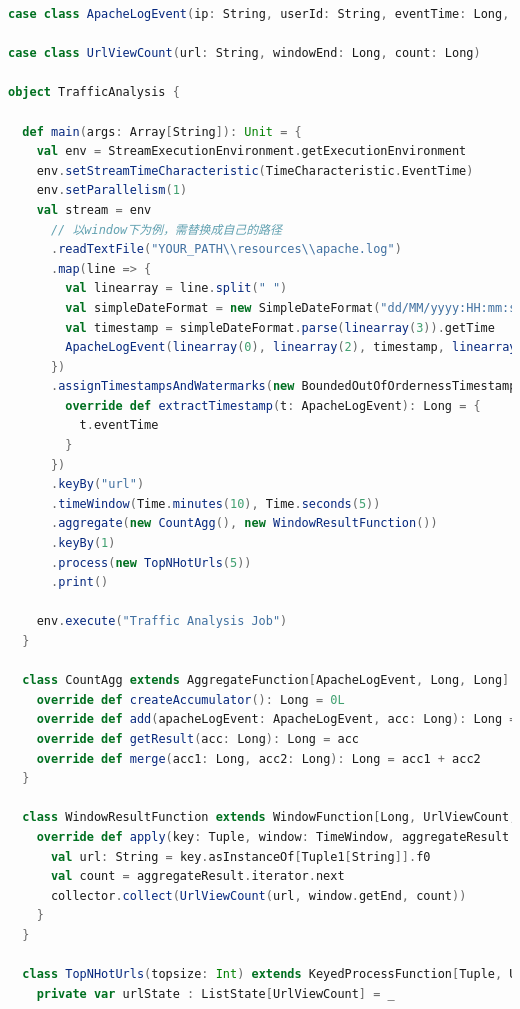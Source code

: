 \documentclass[oneside]{ctexbook}
\begin{document}
\begin{lstlisting}[language=scala, caption=NetworkTrafficAnalysis/src/main/scala/TrafficAnalysis.scala]
case class ApacheLogEvent(ip: String, userId: String, eventTime: Long, method: String, url: String)

case class UrlViewCount(url: String, windowEnd: Long, count: Long)

object TrafficAnalysis {

  def main(args: Array[String]): Unit = {
    val env = StreamExecutionEnvironment.getExecutionEnvironment
    env.setStreamTimeCharacteristic(TimeCharacteristic.EventTime)
    env.setParallelism(1)
    val stream = env
      // 以window下为例，需替换成自己的路径
      .readTextFile("YOUR_PATH\\resources\\apache.log")
      .map(line => {
        val linearray = line.split(" ")
        val simpleDateFormat = new SimpleDateFormat("dd/MM/yyyy:HH:mm:ss")
        val timestamp = simpleDateFormat.parse(linearray(3)).getTime
        ApacheLogEvent(linearray(0), linearray(2), timestamp, linearray(5), linearray(6))
      })
      .assignTimestampsAndWatermarks(new BoundedOutOfOrdernessTimestampExtractor[ApacheLogEvent](Time.milliseconds(1000)) {
        override def extractTimestamp(t: ApacheLogEvent): Long = {
          t.eventTime
        }
      })
      .keyBy("url")
      .timeWindow(Time.minutes(10), Time.seconds(5))
      .aggregate(new CountAgg(), new WindowResultFunction())
      .keyBy(1)
      .process(new TopNHotUrls(5))
      .print()

    env.execute("Traffic Analysis Job")
  }

  class CountAgg extends AggregateFunction[ApacheLogEvent, Long, Long] {
    override def createAccumulator(): Long = 0L
    override def add(apacheLogEvent: ApacheLogEvent, acc: Long): Long = acc + 1
    override def getResult(acc: Long): Long = acc
    override def merge(acc1: Long, acc2: Long): Long = acc1 + acc2
  }

  class WindowResultFunction extends WindowFunction[Long, UrlViewCount, Tuple, TimeWindow] {
    override def apply(key: Tuple, window: TimeWindow, aggregateResult: Iterable[Long], collector: Collector[UrlViewCount]) : Unit = {
      val url: String = key.asInstanceOf[Tuple1[String]].f0
      val count = aggregateResult.iterator.next
      collector.collect(UrlViewCount(url, window.getEnd, count))
    }
  }

  class TopNHotUrls(topsize: Int) extends KeyedProcessFunction[Tuple, UrlViewCount, String] {
    private var urlState : ListState[UrlViewCount] = _


\end{lstlisting}
\end{document}
